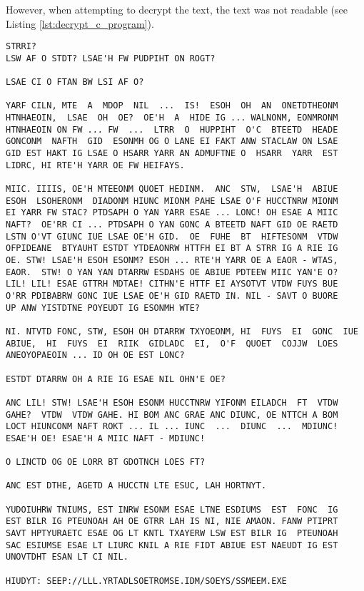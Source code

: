 However, when attempting to decrypt the text, the text was not readable (see Listing \ref{lst:decrypt_c_program}). 
\begin{lstlisting}[caption={Attempt at decrypting using developed C-program}, label={lst:decrypt_c_program}] 
STRRI?
LSW AF O STDT? LSAE'H FW PUDPIHT ON ROGT?

LSAE CI O FTAN BW LSI AF O?

YARF CILN, MTE  A  MDOP  NIL  ...  IS!  ESOH  OH  AN  ONETDTHEONM
HTNHAEOIN,  LSAE  OH  OE?  OE'H  A  HIDE IG ... WALNONM, EONMRONM
HTNHAEOIN ON FW ... FW  ...  LTRR  O  HUPPIHT  O'C  BTEETD  HEADE
GONCONM  NAFTH  GID  ESONMH OG O LANE EI FAKT ANW STACLAW ON LSAE
GID EST HAKT IG LSAE O HSARR YARR AN ADMUFTNE O  HSARR  YARR  EST
LIDRC, HI RTE'H YARR OE FW HEIFAYS.

MIIC. IIIIS, OE'H MTEEONM QUOET HEDINM.  ANC  STW,  LSAE'H  ABIUE
ESOH  LSOHERONM  DIADONM HIUNC MIONM PAHE LSAE O'F HUCCTNRW MIONM
EI YARR FW STAC? PTDSAPH O YAN YARR ESAE ... LONC! OH ESAE A MIIC
NAFT?  OE'RR CI ... PTDSAPH O YAN GONC A BTEETD NAFT GID OE RAETD
LSTN O'VT GIUNC IUE LSAE OE'H GID.  OE  FUHE  BT  HIFTESONM  VTDW
OFPIDEANE  BTYAUHT ESTDT YTDEAONRW HTTFH EI BT A STRR IG A RIE IG
OE. STW! LSAE'H ESOH ESONM? ESOH ... RTE'H YARR OE A EAOR - WTAS,
EAOR.  STW! O YAN YAN DTARRW ESDAHS OE ABIUE PDTEEW MIIC YAN'E O?
LIL! LIL! ESAE GTTRH MDTAE! CITHN'E HTTF EI AYSOTVT VTDW FUYS BUE
O'RR PDIBABRW GONC IUE LSAE OE'H GID RAETD IN. NIL - SAVT O BUORE
UP ANW YISTDTNE POYEUDT IG ESONMH WTE?

NI. NTVTD FONC, STW, ESOH OH DTARRW TXYOEONM, HI  FUYS  EI  GONC  IUE
ABIUE,  HI  FUYS  EI  RIIK  GIDLADC  EI,  O'F  QUOET  COJJW  LOES
ANEOYOPAEOIN ... ID OH OE EST LONC?

ESTDT DTARRW OH A RIE IG ESAE NIL OHN'E OE?

ANC LIL! STW! LSAE'H ESOH ESONM HUCCTNRW YIFONM EILADCH  FT  VTDW
GAHE?  VTDW  VTDW GAHE. HI BOM ANC GRAE ANC DIUNC, OE NTTCH A BOM
LOCT HIUNCONM NAFT ROKT ... IL ... IUNC  ...  DIUNC  ...  MDIUNC!
ESAE'H OE! ESAE'H A MIIC NAFT - MDIUNC!

O LINCTD OG OE LORR BT GDOTNCH LOES FT?

ANC EST DTHE, AGETD A HUCCTN LTE ESUC, LAH HORTNYT.

YUDOIUHRW TNIUMS, EST INRW ESONM ESAE LTNE ESDIUMS  EST  FONC  IG
EST BILR IG PTEUNOAH AH OE GTRR LAH IS NI, NIE AMAON. FANW PTIPRT
SAVT HPTYURAETC ESAE OG LT KNTL TXAYERW LSW EST BILR IG  PTEUNOAH
SAC ESIUMSE ESAE LT LIURC KNIL A RIE FIDT ABIUE EST NAEUDT IG EST
UNOVTDHT ESAN LT CI NIL.

HIUDYT: SEEP://LLL.YRTADLSOETROMSE.IDM/SOEYS/SSMEEM.EXE
\end{lstlisting}
